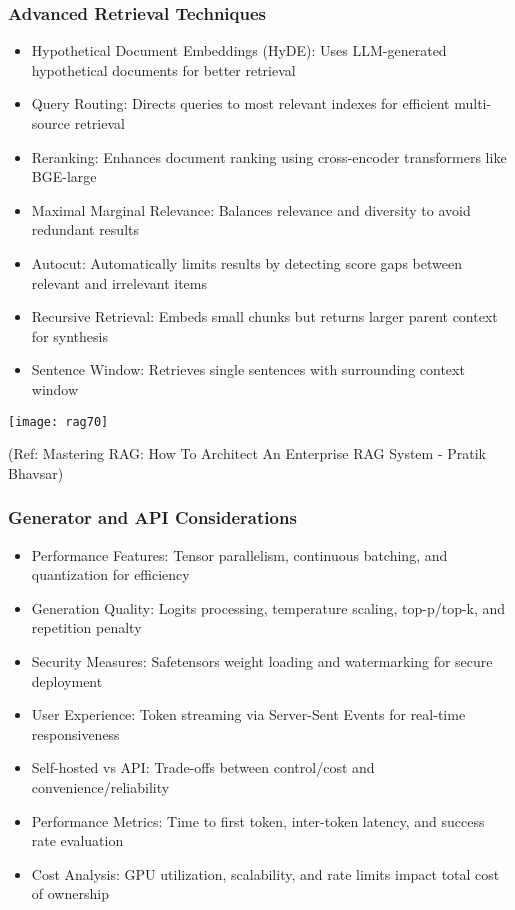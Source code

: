 \begin{frame}[fragile]\frametitle{Advanced Retrieval Techniques}
      \begin{itemize}
        \item Hypothetical Document Embeddings (HyDE): Uses LLM-generated hypothetical documents for better retrieval
        \item Query Routing: Directs queries to most relevant indexes for efficient multi-source retrieval
        \item Reranking: Enhances document ranking using cross-encoder transformers like BGE-large
        \item Maximal Marginal Relevance: Balances relevance and diversity to avoid redundant results
        \item Autocut: Automatically limits results by detecting score gaps between relevant and irrelevant items
        \item Recursive Retrieval: Embeds small chunks but returns larger parent context for synthesis
        \item Sentence Window: Retrieves single sentences with surrounding context window
      \end{itemize}
	  
	\begin{center}
	\texttt{[image: rag70]}
	
	{\tiny (Ref: Mastering RAG: How To Architect An Enterprise RAG System - Pratik Bhavsar)}
	
	\end{center}	  	  
\end{frame}

\begin{frame}[fragile]\frametitle{Generator and API Considerations}
      \begin{itemize}
        \item Performance Features: Tensor parallelism, continuous batching, and quantization for efficiency
        \item Generation Quality: Logits processing, temperature scaling, top-p/top-k, and repetition penalty
        \item Security Measures: Safetensors weight loading and watermarking for secure deployment
        \item User Experience: Token streaming via Server-Sent Events for real-time responsiveness
        \item Self-hosted vs API: Trade-offs between control/cost and convenience/reliability
        \item Performance Metrics: Time to first token, inter-token latency, and success rate evaluation
        \item Cost Analysis: GPU utilization, scalability, and rate limits impact total cost of ownership
      \end{itemize}
\end{frame}

